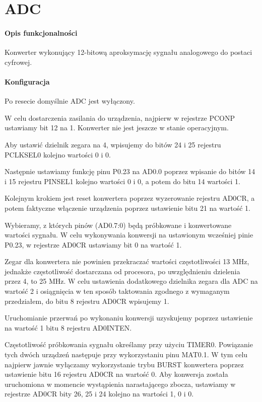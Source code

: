 \documentclass{article}
\begin{document}
    \section{ADC}

        \paragraph{Opis funkcjonalności}

            Konwerter wykonujący 12-bitową aproksymację sygnału analogowego do
            postaci cyfrowej. 

	\paragraph{Konfiguracja}

	    Po resecie domyślnie ADC jest wyłączony.

	    W celu dostarczenia zasilania do urządzenia, najpierw w rejestrze
	    PCONP ustawiamy bit 12 na 1. Konwerter nie jest jeszcze w stanie
	    operacyjnym.

	    Aby ustawić dzielnik zegara na 4, wpisujemy do bitów 24 i 25
	    rejestru PCLKSEL0 kolejno wartości 0 i 0.

	    Następnie ustawiamy funkcję pinu P0.23 na AD0.0 poprzez wpisanie
	    do bitów 14 i 15 rejestru PINSEL1 kolejno wartości 0 i 0, a potem
	    do bitu 14 wartości 1.

	    Kolejnym krokiem jest reset konwertera poprzez wyzerowanie rejestru
	    AD0CR, a potem faktyczne włączenie urządzenia poprzez ustawienie
	    bitu 21 na wartość 1.

	    Wybieramy, z których pinów (AD0.7:0) będą próbkowane i konwertowane
	    wartości sygnału. W celu wykonywania konwersji na ustawionym
	    wcześniej pinie P0.23, w rejestrze AD0CR ustawiamy bit 0 na wartość
	    1.

	    Zegar dla konwertera nie powinien przekraczać wartości
	    częstotliwości 13 MHz, jednakże częstotliwość dostarczana
	    od procesora, po uwzględnieniu dzielenia przez 4, to 25 MHz.
	    W celu ustawienia dodatkowego dzielnika zegara dla ADC na wartość 2
	    i osiągnięcia w ten sposób taktowania zgodnego z wymaganym
	    przedziałem, do bitu 8 rejestru AD0CR wpisujemy 1. 

	    Uruchomianie przerwań po wykonaniu konwersji uzyskujemy poprzez
	    ustawienie na wartość 1 bitu 8 rejestru AD0INTEN.

	    Częstotliwość próbkowania sygnału określamy przy użyciu TIMER0.
	    Powiązanie tych dwóch urządzeń następuje przy wykorzystaniu pinu
	    MAT0.1. W tym celu najpierw jawnie wyłączamy wykorzystanie trybu
	    BURST konwertera poprzez ustawienie bitu 16 rejestru AD0CR na
	    wartość 0. Aby konwersja została uruchomiona w momencie wystąpienia
	    narastającego zbocza, ustawiamy w rejestrze AD0CR bity 26, 25
	    i 24 kolejno na wartości 1, 0 i 0.
	   
\end{document}

